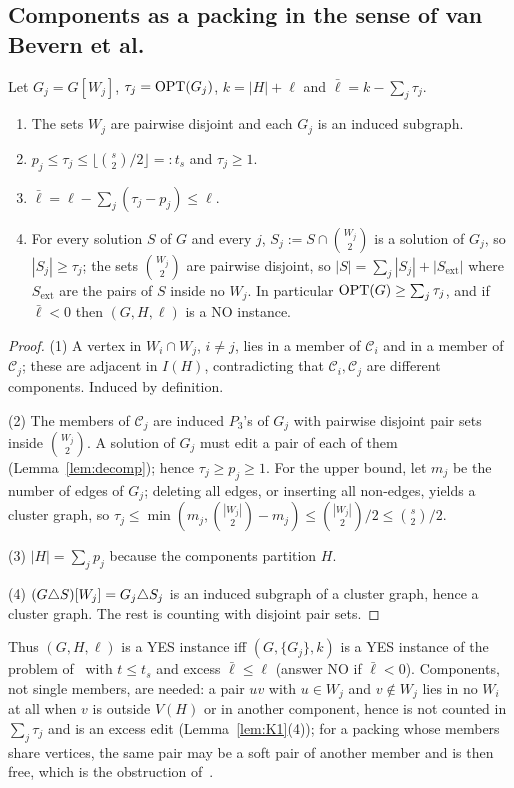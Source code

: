 \subsection{Components as a packing in the sense of van Bevern et al.}
\begin{lemma}\label{lem:K1}
Let $G_j=G[W_j]$, $\tau_j=\mathrm{OPT}(G_j)$, $k=|H|+\ell$ and $\bar\ell=k-\sum_j\tau_j$.
\begin{enumerate}
\item The sets $W_j$ are pairwise disjoint and each $G_j$ is an induced subgraph.
\item $p_j\le\tau_j\le\lfloor\binom s2/2\rfloor=:t_s$ and $\tau_j\ge1$.
\item $\bar\ell=\ell-\sum_j(\tau_j-p_j)\le\ell$.
\item For every solution $S$ of $G$ and every $j$, $S_j:=S\cap\binom{W_j}2$ is a solution of $G_j$, so $|S_j|\ge\tau_j$; the sets $\binom{W_j}2$ are pairwise disjoint, so $|S|=\sum_j|S_j|+|S_{\mathrm{ext}}|$ where $S_{\mathrm{ext}}$ are the pairs of $S$ inside no $W_j$. In particular $\mathrm{OPT}(G)\ge\sum_j\tau_j$, and if $\bar\ell<0$ then $(G,H,\ell)$ is a NO instance.
\end{enumerate}
\end{lemma}
\begin{proof}
(1) A vertex in $W_i\cap W_j$, $i\ne j$, lies in a member of $\mathcal C_i$ and in a member of $\mathcal C_j$; these are adjacent in $I(H)$, contradicting that $\mathcal C_i,\mathcal C_j$ are different components. Induced by definition.

(2) The members of $\mathcal C_j$ are induced $P_3$'s of $G_j$ with pairwise disjoint pair sets inside $\binom{W_j}2$. A solution of $G_j$ must edit a pair of each of them (Lemma~\ref{lem:decomp}); hence $\tau_j\ge p_j\ge1$. For the upper bound, let $m_j$ be the number of edges of $G_j$; deleting all edges, or inserting all non-edges, yields a cluster graph, so $\tau_j\le\min(m_j,\binom{|W_j|}2-m_j)\le\binom{|W_j|}2/2\le\binom s2/2$.

(3) $|H|=\sum_jp_j$ because the components partition $H$.

(4) $(G\triangle S)[W_j]=G_j\triangle S_j$ is an induced subgraph of a cluster graph, hence a cluster graph. The rest is counting with disjoint pair sets.
\end{proof}
Thus $(G,H,\ell)$ is a YES instance iff $(G,\{G_j\},k)$ is a YES instance of the problem of~\cite{BFK18} with $t\le t_s$ and excess $\bar\ell\le\ell$ (answer NO if $\bar\ell<0$). Components, not single members, are needed: a pair $uv$ with $u\in W_j$ and $v\notin W_j$ lies in no $W_i$ at all when $v$ is outside $V(H)$ or in another component, hence is not counted in $\sum_j\tau_j$ and is an excess edit (Lemma~\ref{lem:K1}(4)); for a packing whose members share vertices, the same pair may be a soft pair of another member and is then free, which is the obstruction of~\cite{LPS23}.

